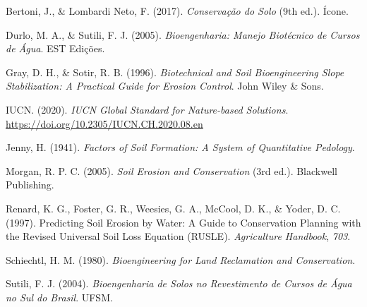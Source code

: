 \documentclass[
  portuguese,
  11pt,
  a4paper,
  open=any]{scrbook}
\newlength{\cslhangindent}
\newenvironment{CSLReferences}[2] %
 {\begin{list}{}{%
  \setlength{\itemindent}{0pt}
  \setlength{\leftmargin}{0pt}
  \setlength{\parsep}{0pt}
  \ifodd #1
   \setlength{\leftmargin}{\cslhangindent}
   \setlength{\itemindent}{-1\cslhangindent}
  \fi
  \setlength{\itemsep}{#2\baselineskip}}}
 {\end{list}}
\begin{document}
\label{refs}
\begin{CSLReferences}{1}{0}
Bertoni, J., \& Lombardi Neto, F. (2017). \emph{Conservação do Solo}
(9th ed.). Ícone.

Durlo, M. A., \& Sutili, F. J. (2005). \emph{Bioengenharia: Manejo
Biotécnico de Cursos de Água}. EST Edições.

Gray, D. H., \& Sotir, R. B. (1996). \emph{Biotechnical and Soil
Bioengineering Slope Stabilization: A Practical Guide for Erosion
Control}. John Wiley \& Sons.

IUCN. (2020). \emph{IUCN Global Standard for Nature-based Solutions}.
\url{https://doi.org/10.2305/IUCN.CH.2020.08.en}

Jenny, H. (1941). \emph{Factors of Soil Formation: A System of
Quantitative Pedology}.

Morgan, R. P. C. (2005). \emph{Soil Erosion and Conservation} (3rd ed.).
Blackwell Publishing.

Renard, K. G., Foster, G. R., Weesies, G. A., McCool, D. K., \& Yoder,
D. C. (1997). Predicting Soil Erosion by Water: A Guide to Conservation
Planning with the Revised Universal Soil Loss Equation (RUSLE).
\emph{Agriculture Handbook}, \emph{703}.

Schiechtl, H. M. (1980). \emph{Bioengineering for Land Reclamation and
Conservation}.

Sutili, F. J. (2004). \emph{Bioengenharia de Solos no Revestimento de
Cursos de Água no Sul do Brasil}. UFSM.

\end{CSLReferences}


\backmatter
\end{document}
